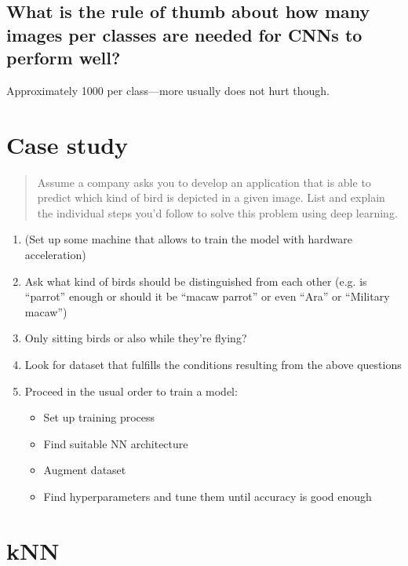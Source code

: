 \subsection{What is the rule of thumb about how many images per classes are needed for CNNs to perform well?}
Approximately 1000 per class---more usually does not hurt though.


\section{Case study}

\begin{quote}
Assume a company asks you to develop an application that is able to predict which kind of bird is depicted in a given image. List and explain the individual steps you’d follow to solve this problem using deep learning.
\end{quote}
\begin{enumerate}
\item (Set up some machine that allows to train the model with hardware acceleration)
\item Ask what kind of birds should be distinguished from each other (e.g. is ``parrot'' enough or should it be ``macaw parrot'' or even ``Ara'' or ``Military macaw'')
\item Only sitting birds or also while they're flying? 
\item Look for dataset that fulfills the conditions resulting from the above questions
\item Proceed in the usual order to train a model:
\begin{itemize}
\item Set up training process
\item Find suitable NN architecture
\item Augment dataset 
\item Find hyperparameters and tune them until accuracy is good enough
\end{itemize}
\end{enumerate}

\section{kNN}
